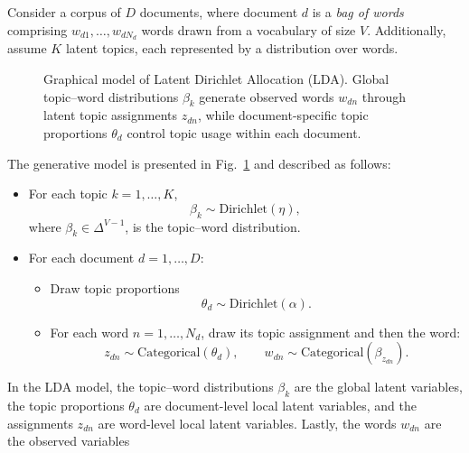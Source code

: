 Consider a corpus of $D$ documents, where document $d$ is a \emph{bag of words} comprising $w_{d1},\dots,w_{dN_d}$ words drawn from a vocabulary of size $V$. Additionally, assume $K$ latent topics, each represented by a distribution over words.

\begin{figure}[t]
\centering
{}
\caption{Graphical model of Latent Dirichlet Allocation (LDA).
Global topic--word distributions $\beta_k$ generate observed words $w_{dn}$ through
latent topic assignments $z_{dn}$, while document-specific topic proportions $\theta_d$
control topic usage within each document.}
\label{fig:lda_graphical_model}
\end{figure}


The generative model is presented in Fig.~\ref{fig:lda_graphical_model} and described as follows: 
\begin{itemize}
    \item For each topic $k=1,\dots,K$, 
    \[
    \beta_k \sim \mathrm{Dirichlet}(\eta),
    \]
    where $\beta_k \in \Delta^{V-1}$, is the topic--word distribution.
    \item For each document $d=1,\dots,D$:
    \begin{itemize}
        \item Draw topic proportions
        \[
        \theta_d \sim \mathrm{Dirichlet}(\alpha).
        \]
        \item For each word $n=1,\dots,N_d$, draw its topic assignment and then the word:
        \[
        z_{dn} \sim \mathrm{Categorical}(\theta_d),
        \qquad
        w_{dn} \sim \mathrm{Categorical}(\beta_{z_{dn}}).
        \]
    \end{itemize}
\end{itemize}

\begin{remark}
    In the LDA model, the topic--word distributions $\beta_k$ are the global latent variables, the topic proportions $\theta_d$ are document-level local latent variables, and the assignments $z_{dn}$ are word-level local latent variables. Lastly, the words $w_{dn}$ are the observed variables
\end{remark}

